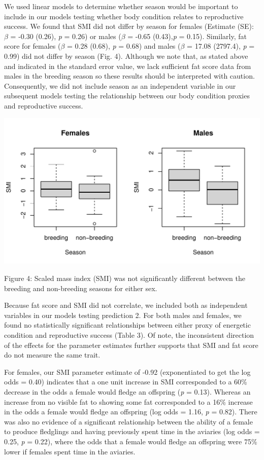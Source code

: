 \documentclass[
]{article}
\begin{document}
We used linear models to determine whether season would be important to
include in our models testing whether body condition relates to
reproductive success. We found that SMI did not differ by season for
females (Estimate (SE): \emph{\(\beta\)} = -0.30 (0.26), \emph{p} =
0.26) or males (\emph{\(\beta\)} = -0.65 (0.43),\emph{p} = 0.15).
Similarly, fat score for females (\emph{\(\beta\)} = 0.28 (0.68),
\emph{p} = 0.68) and males (\emph{\(\beta\)} = 17.08 (2797.4), \emph{p}
= 0.99) did not differ by season (Fig. 4). Although we note that, as
stated above and indicated in the standard error value, we lack
sufficient fat score data from males in the breeding season so these
results should be interpreted with caution. Consequently, we did not
include season as an independent variable in our subsequent models
testing the relationship between our body condition proxies and
reproductive success.

\includegraphics{gcondition_files/figure-latex/p2 condition and season-1.pdf}

Figure 4: Scaled mass index (SMI) was not significantly different
between the breeding and non-breeding seasons for either sex.

Because fat score and SMI did not correlate, we included both as
independent variables in our models testing prediction 2. For both males
and females, we found no statistically significant relationships between
either proxy of energetic condition and reproductive success (Table 3).
Of note, the inconsistent direction of the effects for the parameter
estimates further supports that SMI and fat score do not measure the
same trait.

For females, our SMI parameter estimate of -0.92 (exponentiated to get
the log odds = 0.40) indicates that a one unit increase in SMI
corresponded to a 60\% decrease in the odds a female would fledge an
offspring (\emph{p} = 0.13). Whereas an increase from no visible fat to
showing some fat corresponded to a 16\% increase in the odds a female
would fledge an offspring (log odds = 1.16, \emph{p} = 0.82). There was
also no evidence of a significant relationship between the ability of a
female to produce fledglings and having previously spent time in the
aviaries (log odds = 0.25, \emph{p} = 0.22), where the odds that a
female would fledge an offspring were 75\% lower if females spent time
in the aviaries.
\end{document}
